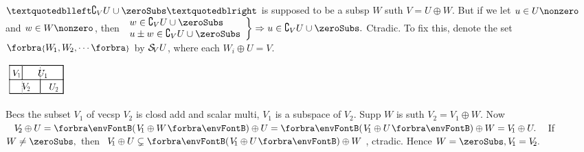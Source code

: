 \BulletPointX{}\;\;$“\complement_V U \cup \zeroSubs”$ is supposed to be a subsp $W$ suth $V=U\oplus W$.\TextB{\vspace{3pt}}
But if we let $u\in U\nonzero$ and $w\in W\nonzero$, then $\MathRightBrace{l}{w\in\complement_V U \cup \zeroSubs\\ u\pm w\in\complement_V U \cup \zeroSubs }\Rightarrow u\in\complement_V U \cup \zeroSubs.$ Ctradic.\vspace{3pt}\TextB{}
To fix this, {\FontLarge denote the set $\Bra{W_{\hspace{-1pt}1},W_{\hspace{-1pt}2},\cdots}$ by $\mathcal{S}_{\!V}U$,} {where each $W_{\!i}\oplus U=V.$}
\SepLine

\par\vspace{-38pt}\quad
\hspace{450pt}\includegraphics[width=2.4cm,height=1.2cm,scale=0.22]{diagram1C-1.png}\vspace{-2pt}
\SepLine\pagebreak

Becs the subset $V_{\!1}$ of vecsp $V_{\!2}$ is closd add and scalar multi, $V_{\!1}$ is a subspace of $V_{\!2}.$\parSol{}
Supp $W$ is suth $V_{\!2}=V_{\!1}\oplus W.$ Now $V_{\!2}\oplus U=\Par{V_{\!1}\oplus W}\oplus U=\Par{V_{\!1}\oplus U}\oplus W=V_{\!1}\oplus U.$\parSol{}
If $W\neq\zeroSubs,$ then $V_{\!1}\oplus U\subsetneq\Par{V_{\!1}\oplus U}\oplus W$, ctradic. Hence $W=\zeroSubs,V_{\!1}=V_{\!2}.$\PfEnd
\SepLine



